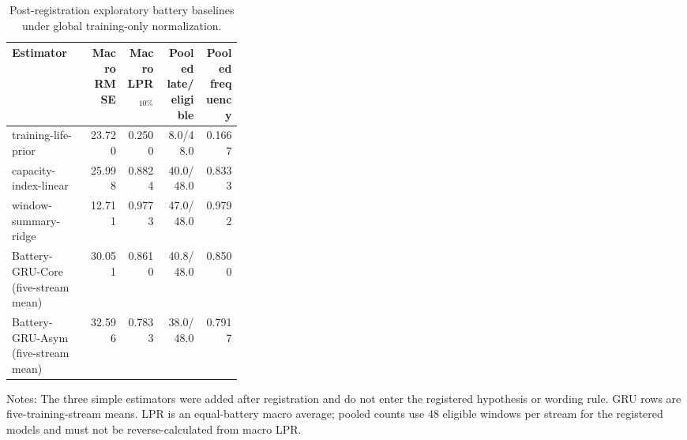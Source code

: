 \begin{table}[H]
\centering
\caption{Post-registration exploratory battery baselines under global training-only normalization.}
\label{tab:battery-baselines}
\scriptsize
\setlength{\tabcolsep}{4pt}
\begin{tabular}{p{0.34\linewidth}rrrr}
\toprule
Estimator & Macro RMSE & Macro LPR$_{10\%}$ & Pooled late/eligible & Pooled frequency \\
\midrule
training-life-prior & 23.720 & 0.2500 & 8.0/48.0 & 0.1667 \\
capacity-index-linear & 25.998 & 0.8824 & 40.0/48.0 & 0.8333 \\
window-summary-ridge & 12.711 & 0.9773 & 47.0/48.0 & 0.9792 \\
Battery-GRU-Core (five-stream mean) & 30.051 & 0.8610 & 40.8/48.0 & 0.8500 \\
Battery-GRU-Asym (five-stream mean) & 32.596 & 0.7833 & 38.0/48.0 & 0.7917 \\
\bottomrule
\end{tabular}
\begin{minipage}{0.98\linewidth}\footnotesize Notes: The three simple estimators were added after registration and do not enter the registered hypothesis or wording rule. GRU rows are five-training-stream means. LPR is an equal-battery macro average; pooled counts use 48 eligible windows per stream for the registered models and must not be reverse-calculated from macro LPR.\end{minipage}
\end{table}
